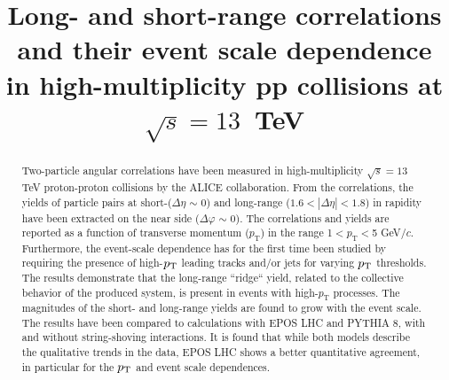 \documentclass[ALICE,manyauthors]{cernphprep}
\begin{document}
\begin{titlepage}

\PHyear{}
\PHdate{\today}
%

\title{Long- and short-range correlations and their event scale dependence in high-multiplicity pp collisions at $\sqrt{s} = 13$~TeV}


\begin{abstract}
%
Two-particle angular correlations have been measured in high-multiplicity $\sqrt{s} =13$ TeV proton-proton collisions by the ALICE collaboration. From the correlations, the yields of particle pairs at short-($\Delta\eta$ $\sim$ 0) and long-range ($1.6 < |\Delta\eta| < 1.8$) in rapidity have been extracted on the near side ($\Delta\varphi$ $\sim$ 0).
The correlations and yields are reported as a function of transverse momentum ($p_{\mathrm T}$) in the range 1$ < p_{\mathrm T} < $5 GeV/$c$.
Furthermore, the event-scale dependence has for the first time been studied by requiring the presence of high-$p_{\rm T}$ leading tracks and/or jets for varying $p_{\rm T}$ thresholds. 
The results demonstrate that the long-range ``ridge`` yield, related to the collective behavior of the produced system, is present in events with high-$p_{\mathrm T}$ processes. The magnitudes of the short- and long-range yields are found to grow with the event scale. 
The results have been compared to calculations with EPOS LHC and PYTHIA 8, with and without string-shoving interactions. It is found that while both models describe the qualitative trends in the data, EPOS LHC shows a better quantitative agreement, in particular for the $p_{\rm T}$ and event scale dependences.


\end{abstract}
\end{titlepage}
\end{document}
